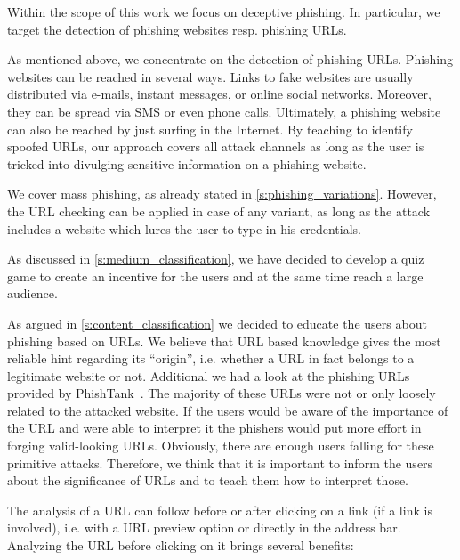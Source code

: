 \begin{description}[leftmargin=0cm]
	\item[Deceptive Phishing as Phishing Technique] Within the scope of this work we focus on deceptive phishing.
 In particular, we target the detection of phishing websites resp. phishing URLs.
	\item[Several Attack Channels] As mentioned above, we concentrate on the detection of phishing URLs.
 Phishing websites can be reached in several ways.
 Links to fake websites are usually distributed via e-mails, instant messages, or online social networks.
 Moreover, they can be spread via SMS or even phone calls.
 Ultimately, a phishing website can also be reached by just surfing in the Internet.
 By teaching to identify spoofed URLs, our approach covers all attack channels as long as the user is tricked into divulging sensitive information on a phishing website.

	\item[Mass Phishing as Variation of Phishing] We cover mass phishing, as already stated in \autoref{s:phishing_variations}.
 However, the URL checking can be applied in case of any variant, as long as the attack includes a website which lures the user to type in his credentials.

	\item[Game and Quiz Based Learning as Communication Medium] As discussed in \autoref{s:medium_classification}, we have decided to develop a quiz game to create an incentive for the users and at the same time reach a large audience. 

	\item[URL Based Knowledge as Learning Content] As argued in \autoref{s:content_classification} we decided to educate the users about phishing based on URLs. 
We believe that URL based knowledge gives the most reliable hint regarding its ``origin'', i.e. whether a URL in fact belongs to a legitimate website or not.
Additional we had a look at the phishing URLs provided by PhishTank~\cite{phishtank}. The majority of these URLs were not or only loosely related to the attacked website. If the users would be aware of the importance of the URL and were able to interpret it the phishers would put more effort in forging valid-looking URLs. Obviously, there are enough users falling for these primitive attacks. Therefore, we think that it is important to inform the users about the significance of URLs and to teach them how to interpret those.

	\item[After Click URL Analysis] The analysis of a URL can follow before or after clicking on a link (if a link is involved), i.e. with a URL preview option or directly in the address bar. 
Analyzing the URL before clicking on it brings several benefits:


\end{description}
